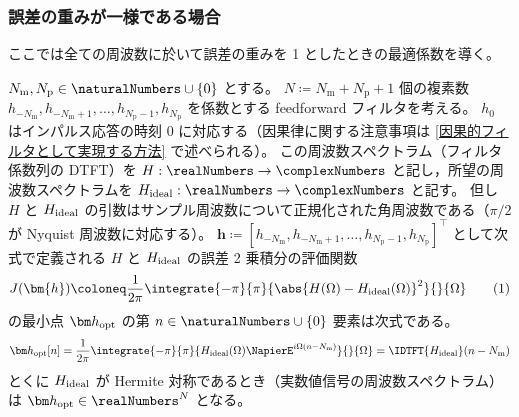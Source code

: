         \subsubsection{誤差の重みが一様である場合}
            \label{誤差の重みが一様である場合}
            \newcommand*{\Nm}{{N_\text{m}}}
            \newcommand*{\Np}{{N_\text{p}}}
            ここでは全ての周波数に於いて誤差の重みを 1 としたときの最適係数を導く。
            \begin{shadebox}
                $\Nm,\Np\in\naturalNumbers\cup\{0\}$ とする。
                $N\coloneq\Nm+\Np+1$ 個の複素数 $h_{-\Nm},h_{-\Nm+1},\dots,h_{\Np-1},h_\Np$ を係数とする feedforward フィルタを考える。
                $h_0$ はインパルス応答の時刻 0 に対応する（因果律に関する注意事項は \ref{因果的フィルタとして実現する方法} で述べられる）。
                この周波数スペクトラム（フィルタ係数列の DTFT）を $H:\realNumbers\to\complexNumbers$ と記し，所望の周波数スペクトラムを $\Hideal:\realNumbers\to\complexNumbers$ と記す。
                但し $H$ と $H_\text{ideal}$ の引数はサンプル周波数について正規化された角周波数である（$\pi/2$ が Nyquist 周波数に対応する）。
                $\bm{h} \coloneq [h_{-\Nm},h_{-\Nm+1},\dots,h_{\Np-1},h_\Np]^\top$ として次式で定義される $H$ と $H_\text{ideal}$ の誤差 2 乗積分の評価関数
                \[ J(\bm{h}) \coloneq \frac{1}{2\pi}\integrate{-\pi}{\pi}{\abs{H(\Omega)-\Hideal(\Omega)}^2}{}{\Omega} \tag{1} \]
                の最小点 $\vhOpt$ の第 $n\in\naturalNumbers\cup\{0\}$ 要素は次式である。
                \[ \vhOpt[n] = \frac{1}{2\pi}\integrate{-\pi}{\pi}{\Hideal(\Omega)\NapierE^{i\Omega (n-\Nm)}}{}{\Omega} = \IDTFT{\Hideal}(n-\Nm) \]
                とくに $H_\text{ideal}$ が Hermite 対称であるとき（実数値信号の周波数スペクトラム）は $\vhOpt\in\realNumbers^N$ となる。
            \end{shadebox}
